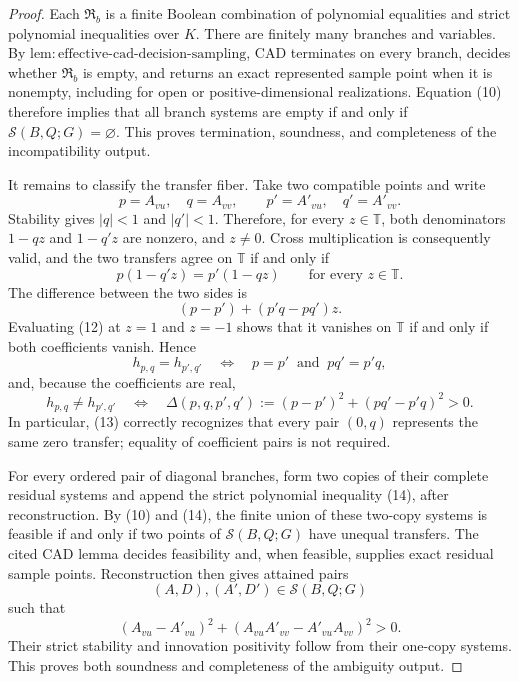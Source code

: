 \documentclass{article}
\begin{document}
\begin{proof}
Each \(\mathfrak R_b\) is a finite Boolean combination of polynomial equalities and strict polynomial inequalities over \(K\).  There are finitely many branches and variables.  By \(\mathrm{lem{:}effective\mbox{-}cad\mbox{-}decision\mbox{-}sampling}\), CAD terminates on every branch, decides whether \(\mathfrak R_b\) is empty, and returns an exact represented sample point when it is nonempty, including for open or positive-dimensional realizations.  Equation (10) therefore implies that all branch systems are empty if and only if \(\mathcal S(B,Q;G)=\varnothing\).  This proves termination, soundness, and completeness of the incompatibility output.

It remains to classify the transfer fiber.  Take two compatible points and write
\[
 p=A_{vu},\quad q=A_{vv},\qquad p'=A'_{vu},\quad q'=A'_{vv}.
\]
Stability gives \(|q|<1\) and \(|q'|<1\).  Therefore, for every \(z\in\mathbb T\), both denominators \(1-qz\) and \(1-q'z\) are nonzero, and \(z\ne0\).  Cross multiplication is consequently valid, and the two transfers agree on \(\mathbb T\) if and only if
\[
 p(1-q'z)=p'(1-qz)\qquad\text{for every }z\in\mathbb T.          \tag{11}
\]
The difference between the two sides is
\[
 (p-p')+(p'q-pq')z.                                               \tag{12}
\]
Evaluating (12) at \(z=1\) and \(z=-1\) shows that it vanishes on \(\mathbb T\) if and only if both coefficients vanish.  Hence
\[
 h_{p,q}=h_{p',q'}
 \quad\Longleftrightarrow\quad
 p=p'\ \text{ and }\ pq'=p'q,                                   \tag{13}
\]
and, because the coefficients are real,
\[
 h_{p,q}\ne h_{p',q'}
 \quad\Longleftrightarrow\quad
 \Delta(p,q,p',q')
 :=(p-p')^2+(pq'-p'q)^2>0.                                       \tag{14}
\]
In particular, (13) correctly recognizes that every pair \((0,q)\) represents the same zero transfer; equality of coefficient pairs is not required.

For every ordered pair of diagonal branches, form two copies of their complete residual systems and append the strict polynomial inequality (14), after reconstruction.  By (10) and (14), the finite union of these two-copy systems is feasible if and only if two points of \(\mathcal S(B,Q;G)\) have unequal transfers.  The cited CAD lemma decides feasibility and, when feasible, supplies exact residual sample points.  Reconstruction then gives attained pairs
\[
 (A,D),(A',D')\in\mathcal S(B,Q;G)
\]
such that
\[
 (A_{vu}-A'_{vu})^2
 +(A_{vu}A'_{vv}-A'_{vu}A_{vv})^2>0.
\]
Their strict stability and innovation positivity follow from their one-copy systems.  This proves both soundness and completeness of the ambiguity output.


\end{proof}
\end{document}
